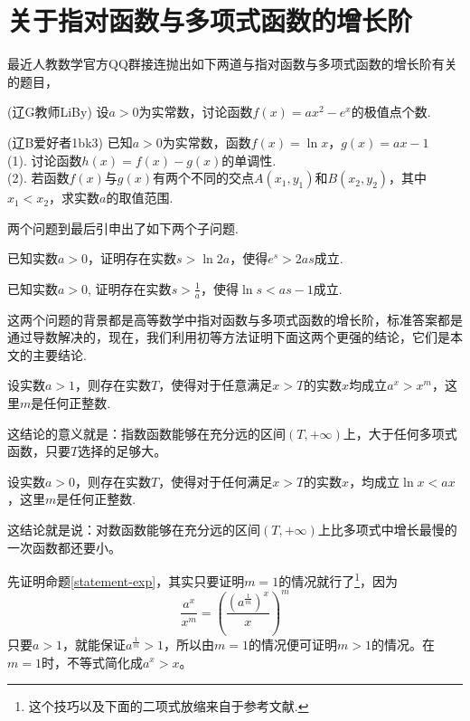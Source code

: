 
\section{关于指对函数与多项式函数的增长阶}
\label{sec:exp-log-level}

最近人教数学官方QQ群接连抛出如下两道与指对函数与多项式函数的增长阶有关的题目，
\begin{exercise}
  (辽G教师LiBy) 设$a>0$为实常数，讨论函数$f(x)=ax^2-e^x$的极值点个数.
\end{exercise}

\begin{exercise}
  (辽B爱好者1bk3) 已知$a>0$为实常数，函数$f(x)=\ln{x}$，$g(x)=ax-1$ \\
  (1). 讨论函数$h(x)=f(x)-g(x)$的单调性. \\
  (2). 若函数$f(x)$与$g(x)$有两个不同的交点$A(x_1,y_1)$和$B(x_2,y_2)$，其中$x_1<x_2$，求实数$a$的取值范围.
\end{exercise}
两个问题到最后引申出了如下两个子问题.
\begin{topic}
  \label{topic-exp}
  已知实数$a>0$，证明存在实数$s>\ln{2a}$，使得$e^s>2as$成立.
\end{topic}

\begin{topic}
  \label{topic-log}
  已知实数$a>0$, 证明存在实数$s>\frac{1}{a}$，使得$\ln{s}<as-1$成立.
\end{topic}

这两个问题的背景都是高等数学中指对函数与多项式函数的增长阶，标准答案都是通过导数解决的，现在，我们利用初等方法证明下面这两个更强的结论，它们是本文的主要结论.
\begin{statement}
  \label{statement-exp}
  设实数$a>1$，则存在实数$T$，使得对于任意满足$x>T$的实数$x$均成立$a^x>x^m$，这里$m$是任何正整数.
\end{statement}
这结论的意义就是：指数函数能够在充分远的区间$(T,+\infty)$上，大于任何多项式函数，只要$T$选择的足够大。

\begin{statement}
  \label{statement-log}
  设实数$a>0$，则存在实数$T$，使得对于任何满足$x>T$的实数$x$，均成立$\ln{x}<ax$，这里$m$是任何正整数.
\end{statement}
这结论就是说：对数函数能够在充分远的区间$(T,+\infty)$上比多项式中增长最慢的一次函数都还要小。

先证明命题\ref{statement-exp}，其实只要证明$m=1$的情况就行了\footnote{这个技巧以及下面的二项式放缩来自于参考文献\cite{calculus-course}.}，因为
\[ \frac{a^x}{x^m} = \left( \frac{(a^{\frac{1}{m}})^x}{x} \right)^m \]
只要$a>1$，就能保证$a^{\frac{1}{m}}>1$，所以由$m=1$的情况便可证明$m>1$的情况。在$m=1$时，不等式简化成$a^x>x$。

